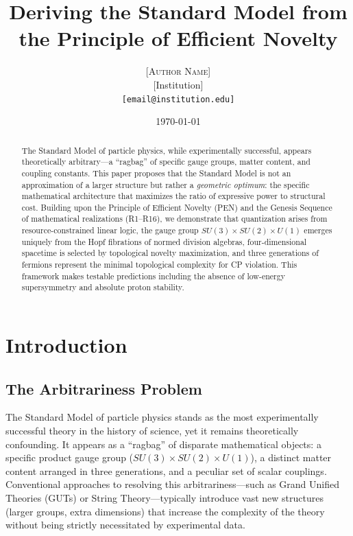 \documentclass[12pt,a4paper]{article}
\title{\textbf{Deriving the Standard Model from the Principle of Efficient Novelty}}
\author{
    \textsc{[Author Name]}\\
    \small [Institution]\\
    \small \texttt{[email@institution.edu]}
}
\date{\today}
\theoremstyle{definition}
\newcommand{\SM}{SU(3) \times SU(2) \times U(1)}
\begin{document}
\maketitle

\begin{abstract}
The Standard Model of particle physics, while experimentally successful, appears theoretically arbitrary—a ``ragbag'' of specific gauge groups, matter content, and coupling constants. This paper proposes that the Standard Model is not an approximation of a larger structure but rather a \emph{geometric optimum}: the specific mathematical architecture that maximizes the ratio of expressive power to structural cost. Building upon the Principle of Efficient Novelty (PEN) and the Genesis Sequence of mathematical realizations (R1--R16), we demonstrate that quantization arises from resource-constrained linear logic, the gauge group $\SM$ emerges uniquely from the Hopf fibrations of normed division algebras, four-dimensional spacetime is selected by topological novelty maximization, and three generations of fermions represent the minimal topological complexity for CP violation. This framework makes testable predictions including the absence of low-energy supersymmetry and absolute proton stability.
\end{abstract}

\tableofcontents
\newpage

\section{Introduction}

\subsection{The Arbitrariness Problem}

The Standard Model of particle physics stands as the most experimentally successful theory in the history of science, yet it remains theoretically confounding. It appears as a ``ragbag'' of disparate mathematical objects: a specific product gauge group ($\SM$), a distinct matter content arranged in three generations, and a peculiar set of scalar couplings. Conventional approaches to resolving this arbitrariness—such as Grand Unified Theories (GUTs) or String Theory—typically introduce vast new structures (larger groups, extra dimensions) that increase the complexity of the theory without being strictly necessitated by experimental data.
\end{document}
